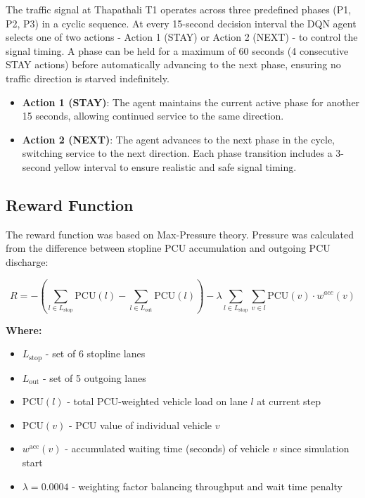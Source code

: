 The traffic signal at Thapathali T1 operates across three predefined phases (P1, P2, P3) in a cyclic sequence. At every 15-second decision interval the DQN agent selects one of two actions - Action 1 (STAY) or Action 2 (NEXT) - to control the signal timing. A phase can be held for a maximum of 60 seconds (4 consecutive STAY actions) before automatically advancing to the next phase, ensuring no traffic direction is starved indefinitely.
\begin{itemize}
  \item \textbf{Action 1 (STAY)}: 
The agent maintains the current active phase for another 15 seconds, allowing continued service to the same direction.
  \item \textbf{Action 2 (NEXT)}: The agent advances to the next phase in the cycle, switching service to the next direction. Each phase transition includes a 3-second yellow interval to ensure realistic and safe signal timing.
\end{itemize}

\subsection{Reward Function}
\noindent The reward function was based on Max-Pressure theory. Pressure was calculated from the difference between stopline PCU accumulation and outgoing PCU discharge:

\begin{equation}
R = -\left(\sum_{l \in L_{\text{stop}}} \text{PCU}(l) - \sum_{l \in L_{\text{out}}} \text{PCU}(l)\right) - \lambda \sum_{l \in L_{\text{stop}}} \sum_{v \in l} \text{PCU}(v) \cdot w^{acc}(v)
\end{equation}

\textbf{Where:}
\begin{itemize}
    \item $L_{\text{stop}}$ - set of 6 stopline lanes
    \item $L_{\text{out}}$ - set of 5 outgoing lanes
    \item $\mathrm{PCU}(l)$ - total PCU-weighted vehicle load on lane $l$ at current step
    \item $\mathrm{PCU}(v)$ - PCU value of individual vehicle $v$
    \item $w^{\text{acc}}(v)$ - accumulated waiting time (seconds) of vehicle $v$ since simulation start
    \item $\lambda = 0.0004$ - weighting factor balancing throughput and wait time penalty
\end{itemize}


